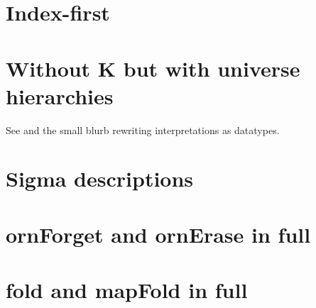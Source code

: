 \appendix


\section{Index-first}

\section{Without K but with universe hierarchies}\label{app:withoutk}
See \cite{practgen} and the small blurb rewriting interpretations as datatypes.

\section{Sigma descriptions}\label{app:large-sigma}

\section{ornForget and ornErase in full}\label{app:ornforget}

\section{fold and mapFold in full}\label{app:gfold}

